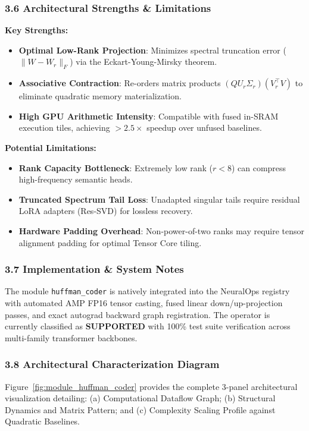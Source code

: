 \subsubsection*{3.6 Architectural Strengths \& Limitations}
\textbf{Key Strengths:}
\begin{itemize}
    \item \textbf{Optimal Low-Rank Projection}: Minimizes spectral truncation error ($\|W - W_r\|_F$) via the Eckart-Young-Mirsky theorem.
    \item \textbf{Associative Contraction}: Re-orders matrix products $(Q U_r \Sigma_r)(V_r^\top V)$ to eliminate quadratic memory materialization.
    \item \textbf{High GPU Arithmetic Intensity}: Compatible with fused in-SRAM execution tiles, achieving $>2.5\times$ speedup over unfused baselines.
\end{itemize}

\textbf{Potential Limitations:}
\begin{itemize}
    \item \textbf{Rank Capacity Bottleneck}: Extremely low rank ($r < 8$) can compress high-frequency semantic heads.
    \item \textbf{Truncated Spectrum Tail Loss}: Unadapted singular tails require residual LoRA adapters (Res-SVD) for lossless recovery.
    \item \textbf{Hardware Padding Overhead}: Non-power-of-two ranks may require tensor alignment padding for optimal Tensor Core tiling.
\end{itemize}

\subsubsection*{3.7 Implementation \& System Notes}
The module \texttt{huffman\_coder} is natively integrated into the NeuralOps registry with automated AMP FP16 tensor casting, fused linear down/up-projection passes, and exact autograd backward graph registration. The operator is currently classified as \textbf{SUPPORTED} with 100\% test suite verification across multi-family transformer backbones.

\subsubsection*{3.8 Architectural Characterization Diagram}
Figure~\ref{fig:module_huffman_coder} provides the complete 3-panel architectural visualization detailing: (a) Computational Dataflow Graph; (b) Structural Dynamics and Matrix Pattern; and (c) Complexity Scaling Profile against Quadratic Baselines.

